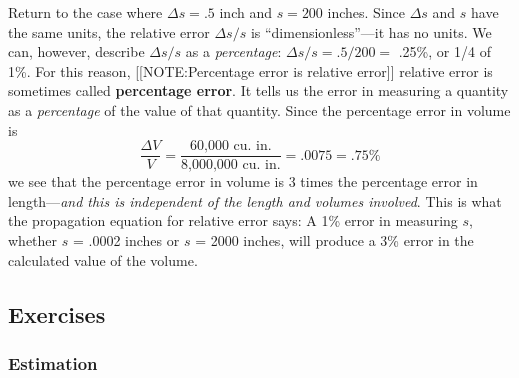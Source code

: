 Return to the case where $\Delta s = .5$ inch and $s = 200$ inches.
Since $\Delta s$ and $s$ have the same units, the relative error
$\Delta s/s$ is ``dimensionless''---it has no units.  We can, however,
describe $\Delta s/s$ as a {\em percentage\/}: $\Delta s/s = .5/200 =$
.25\%, or 1/4 of 1\%.  For this reason,
[[NOTE:Percentage error  is relative error]]
relative error is sometimes called {\bf percentage
  error}. It tells us the error in measuring a
quantity as a {\em percentage\/} of the value of that quantity.  Since
the percentage error in volume is
\[
\dfrac{\Delta V}{V} = \dfrac{\mbox{60,000 cu.\ in.}}
		{\mbox{8,000,000 cu.\ in.}} = 
		.0075 = .75\%
\]
we see that the percentage error in volume is 3 times the percentage
error in length---{\em and this is independent of the length and
  volumes involved}.  This is what the propagation equation for
relative error says: A 1\% error in measuring $s$, whether $s$ = .0002
inches or $s$ = 2000 inches, will produce a 3\% error in the
calculated value of the volume.

\subsection{Exercises}
\label{subsec:exercises}

\subsubsection{Estimation}
\label{subsubsec:estimation}




